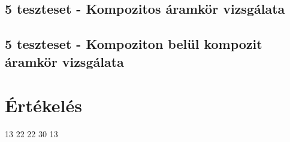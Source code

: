 \subsection{5 teszteset - Kompozitos áramkör vizsgálata}

\subsection{5 teszteset - Kompoziton belül kompozit áramkör vizsgálata}












\section{Értékelés}

\begin{ertekeles}
{13}        %
{22}
{22}
{30}
{13}
\end{ertekeles}

